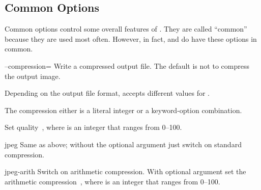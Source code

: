 

\subsection[Common Options\commonpart]{\label{sec:common-options}%
  Common Options\commonpart}

Common options control some overall features of \App.  They are called ``common'' because they
are used most often.  However, in fact, \App{} and \OtherApp{} do have these options in common.

\begin{codelist}
  \label{opt:compression}%
\item[--compression=\metavar{COMPRESSION}]\itemend
  Write a compressed output file.  The default is not to compress the output image.

  Depending on the output file format, \App{} accepts different values for
  .

  \begin{description}
  \item[\acronym{JPEG} format.]\itemend
    The compression either is a literal integer or a keyword\hyp{}option combination.

    \begin{codelist}
    \item[\metavar{LEVEL}]\itemend
      Set  quality~, where  is an integer that
      ranges from 0--100.

    \item[jpeg\optional{:\metavar{LEVEL}}]\itemend
      Same as above; without the optional argument just switch on standard 
      compression.

    \item[jpeg-arith\optional{:\metavar{LEVEL}}]\itemend
      Switch on arithmetic  compression.  With optional argument set the
      arithmetic compression~, where  is an integer that ranges
      from 0--100.
    \end{codelist}


\end{description}
\end{codelist}
